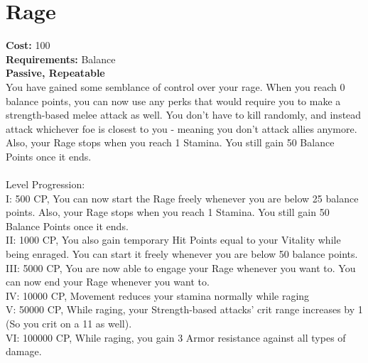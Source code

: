 \section{Rage}
\textbf{Cost:} 100\\
\textbf{Requirements:} Balance\\
\textbf{Passive, Repeatable}\\
You have gained some semblance of control over your rage. When you reach 0 balance points, you can now use any perks that would require you to make a strength-based melee attack as well. You don't have to kill randomly, and instead attack whichever foe is closest to you - meaning you don't attack allies anymore. Also, your Rage stops when you reach 1 Stamina. You still gain 50 Balance Points once it ends.\\
\\
Level Progression:\\
I: 500 CP, You can now start the Rage freely whenever you are below 25 balance points. Also, your Rage stops when you reach 1 Stamina. You still gain 50 Balance Points once it ends.\\
II: 1000 CP, You also gain temporary Hit Points equal to your Vitality while being enraged. You can start it freely whenever you are below 50 balance points.\\
III: 5000 CP, You are now able to engage your Rage whenever you want to. You can now end your Rage whenever you want to.\\
IV: 10000 CP, Movement reduces your stamina normally while raging\\
V: 50000 CP, While raging, your Strength-based attacks' crit range increases by 1 (So you crit on a 11 as well).\\
VI: 100000 CP, While raging, you gain 3 Armor resistance against all types of damage.
